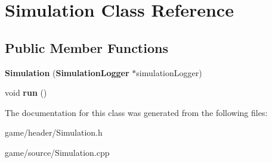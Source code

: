 \section{Simulation Class Reference}
\label{class_simulation}
\subsection*{Public Member Functions}
\begin{DoxyCompactItemize}
\item 
{\bfseries Simulation} ({\bf Simulation\-Logger} $\ast$simulation\-Logger)\label{class_simulation_ac7a66a0b7cca01eaf41e4a1c922ffa42}

\item 
void {\bfseries run} ()\label{class_simulation_ae5c367f87c0b5dc9740bc6d00e44e72c}

\end{DoxyCompactItemize}


The documentation for this class was generated from the following files\-:\begin{DoxyCompactItemize}
\item 
game/header/Simulation.\-h\item 
game/source/Simulation.\-cpp\end{DoxyCompactItemize}

